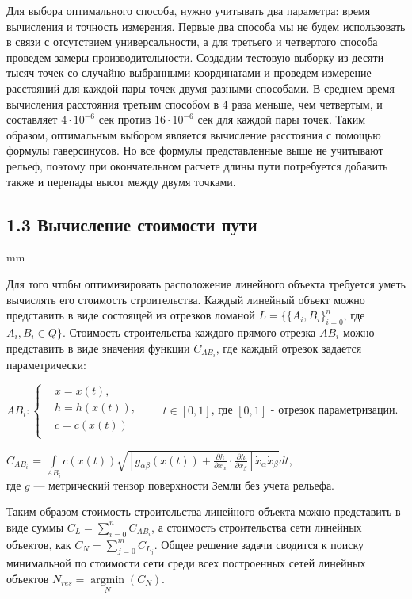 \par
Для выбора оптимального способа, нужно учитывать два параметра: время вычисления и точность измерения. Первые два способа мы не будем использовать в связи с отсутствием универсальности, а для третьего и четвертого способа проведем замеры производительности. Создадим тестовую выборку из десяти тысяч точек со случайно выбранными координатами и проведем измерение расстояний для каждой пары точек двумя разными способами. В среднем время вычисления расстояния третьим способом в 4 раза меньше, чем четвертым, и составляет $4 \cdot 10^{-6}$ сек против $16 \cdot 10^{-6}$ сек для каждой пары точек. Таким образом, оптимальным выбором является вычисление расстояния с помощью формулы гаверсинусов. Но все формулы представленные выше не учитывают рельеф, поэтому при окончательном расчете длины пути потребуется добавить также и перепады высот между двумя точками.
\subsection*{\Large{1.3 Вычисление стоимости пути}}
 mm
Для того чтобы оптимизировать расположение линейного объекта требуется уметь вычислять его стоимость строительства. Каждый линейный объект можно представить в виде состоящей из отрезков ломаной $L = \{\{A_i, B_i\}_{i=0}^n$, где $A_i, B_i \in Q\}$. Стоимость строительства каждого прямого отрезка $AB_i$ можно представить в виде значения функции $C_{AB_i}$, где каждый отрезок задается параметрически:
\par
${\displaystyle AB_i\colon \left\{
	{\begin{aligned}
			&x=x\left(t\right),\\
		    &h=h\left(x(t)\right),\\
			&c=c\left(x(t)\right)\\
	\end{aligned}}\right.\qquad t\in \left[0, 1\right]}$, где $ \left[0, 1\right]$ - отрезок параметризации.

$C_{AB_i}$ = $\int \limits_{AB_i} c\left(x(t)\right) \sqrt{\left[ g_{\alpha\beta}(x(t)) + \frac{\partial h}{\partial x_\alpha} \cdot \frac{\partial h}{\partial x_\beta}\right] \dot{x}_\alpha \dot{x}_\beta} dt$, \\ где $g$ --- метрический тензор поверхности Земли без учета рельефа.
\par
Таким образом стоимость строительства линейного объекта можно представить в виде суммы 
$C_L = \sum_{i = 0}^{n} C_{AB_i}$, а стоимость строительства сети линейных объектов, как 
$C_N = \sum_{j = 0}^{m} C_{L_j}$. Общее решение задачи сводится к поиску минимальной по стоимости сети среди всех построенных сетей линейных объектов $N_{res} = {\underset  {{N}}{\operatorname {argmin}}}(C_N)$.
